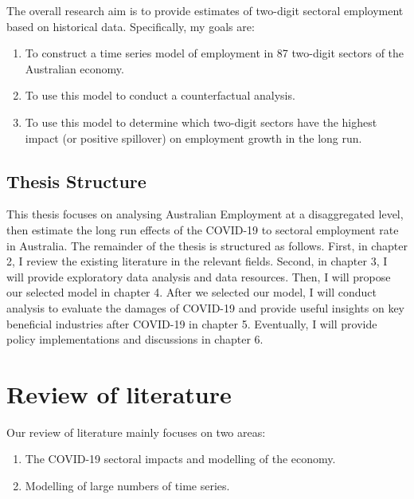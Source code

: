 \documentclass{monashthesis}
\begin{document}
The overall research aim is to provide estimates of two-digit sectoral employment based on historical data. Specifically, my goals are:

\begin{enumerate}
\def\labelenumi{\arabic{enumi}.}
\item
  To construct a time series model of employment in 87 two-digit sectors of the Australian economy.
\item
  To use this model to conduct a counterfactual analysis.
\item
  To use this model to determine which two-digit sectors have the highest impact (or positive spillover) on employment growth in the long run.
\end{enumerate}

\hypertarget{thesis-structure}{%
\section{Thesis Structure}\label{thesis-structure}}

This thesis focuses on analysing Australian Employment at a disaggregated level, then estimate the long run effects of the COVID-19 to sectoral employment rate in Australia. The remainder of the thesis is structured as follows. First, in chapter 2, I review the existing literature in the relevant fields. Second, in chapter 3, I will provide exploratory data analysis and data resources. Then, I will propose our selected model in chapter 4. After we selected our model, I will conduct analysis to evaluate the damages of COVID-19 and provide useful insights on key beneficial industries after COVID-19 in chapter 5. Eventually, I will provide policy implementations and discussions in chapter 6.

\clearpage

\hypertarget{review-of-literature}{%
\chapter{Review of literature}\label{review-of-literature}}

Our review of literature mainly focuses on two areas:

\begin{enumerate}
\def\labelenumi{\arabic{enumi}.}
\item
  The COVID-19 sectoral impacts and modelling of the economy.
\item
  Modelling of large numbers of time series.
\end{enumerate}
\end{document}
